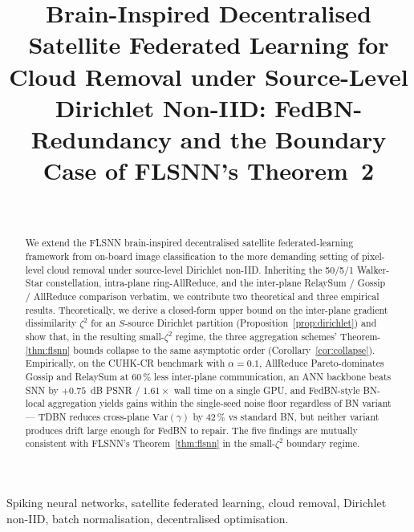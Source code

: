 \documentclass[conference]{IEEEtran}
\newcommand{\Var}{\mathrm{Var}}
\begin{document}
\title{Brain-Inspired Decentralised Satellite Federated Learning for
       Cloud Removal under Source-Level Dirichlet Non-IID:
       FedBN-Redundancy and the Boundary Case of FLSNN's Theorem~2}

\author{
  \\
}

\maketitle

\begin{abstract}
We extend the FLSNN brain-inspired decentralised satellite
federated-learning framework from on-board image classification
to the more demanding setting of pixel-level cloud removal under
source-level Dirichlet non-IID. Inheriting the 50/5/1
Walker-Star constellation, intra-plane ring-AllReduce, and the
inter-plane RelaySum / Gossip / AllReduce comparison verbatim,
we contribute two theoretical and three empirical results.
Theoretically, we derive a closed-form upper bound on the
inter-plane gradient dissimilarity $\zeta^2$ for an $S$-source
Dirichlet partition (Proposition~\ref{prop:dirichlet}) and show
that, in the resulting small-$\zeta^2$ regime, the three
aggregation schemes' Theorem-\ref{thm:flsnn} bounds collapse to
the same asymptotic order (Corollary~\ref{cor:collapse}).
Empirically, on the CUHK-CR benchmark with $\alpha = 0.1$,
AllReduce Pareto-dominates Gossip and RelaySum at $60\,\%$ less
inter-plane communication, an ANN backbone beats SNN by $+0.75$
\,dB PSNR / $1.61\times$ wall time on a single GPU, and
FedBN-style BN-local aggregation yields gains within the
single-seed noise floor regardless of BN variant --- TDBN
reduces cross-plane $\Var(\gamma)$ by $42\,\%$ vs standard BN,
but neither variant produces drift large enough for FedBN to
repair. The five findings are mutually consistent with FLSNN's
Theorem~\ref{thm:flsnn} in the small-$\zeta^2$ boundary regime.
\end{abstract}

\begin{IEEEkeywords}
Spiking neural networks, satellite federated learning, cloud
removal, Dirichlet non-IID, batch normalisation, decentralised
optimisation.
\end{IEEEkeywords}
\end{document}
